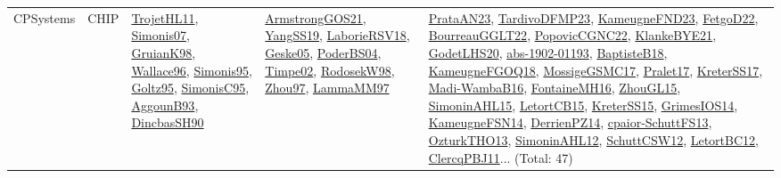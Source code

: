 {\begin{longtable}{lp{3cm}>{\raggedright}p{6cm}>{\raggedright}p{6cm}p{8cm}}
CPSystems & CHIP & \href{articles/TrojetHL11.pdf}{TrojetHL11}\cite{TrojetHL11}, \href{articles/Simonis07.pdf}{Simonis07}\cite{Simonis07}, \href{papers/GruianK98.pdf}{GruianK98}\cite{GruianK98}, \href{articles/Wallace96.pdf}{Wallace96}\cite{Wallace96}, \href{papers/Simonis95.pdf}{Simonis95}\cite{Simonis95}, \href{papers/Goltz95.pdf}{Goltz95}\cite{Goltz95}, \href{papers/SimonisC95.pdf}{SimonisC95}\cite{SimonisC95}, \href{articles/AggounB93.pdf}{AggounB93}\cite{AggounB93}, \href{articles/DincbasSH90.pdf}{DincbasSH90}\cite{DincbasSH90} & \href{papers/ArmstrongGOS21.pdf}{ArmstrongGOS21}\cite{ArmstrongGOS21}, \href{papers/YangSS19.pdf}{YangSS19}\cite{YangSS19}, \href{articles/LaborieRSV18.pdf}{LaborieRSV18}\cite{LaborieRSV18}, \href{papers/Geske05.pdf}{Geske05}\cite{Geske05}, \href{articles/PoderBS04.pdf}{PoderBS04}\cite{PoderBS04}, \href{articles/Timpe02.pdf}{Timpe02}\cite{Timpe02}, \href{papers/RodosekW98.pdf}{RodosekW98}\cite{RodosekW98}, \href{articles/Zhou97.pdf}{Zhou97}\cite{Zhou97}, \href{articles/LammaMM97.pdf}{LammaMM97}\cite{LammaMM97} & \href{articles/PrataAN23.pdf}{PrataAN23}\cite{PrataAN23}, \href{papers/TardivoDFMP23.pdf}{TardivoDFMP23}\cite{TardivoDFMP23}, \href{papers/KameugneFND23.pdf}{KameugneFND23}\cite{KameugneFND23}, \href{articles/FetgoD22.pdf}{FetgoD22}\cite{FetgoD22}, \href{articles/BourreauGGLT22.pdf}{BourreauGGLT22}\cite{BourreauGGLT22}, \href{papers/PopovicCGNC22.pdf}{PopovicCGNC22}\cite{PopovicCGNC22}, \href{papers/KlankeBYE21.pdf}{KlankeBYE21}\cite{KlankeBYE21}, \href{papers/GodetLHS20.pdf}{GodetLHS20}\cite{GodetLHS20}, \href{articles/abs-1902-01193.pdf}{abs-1902-01193}\cite{abs-1902-01193}, \href{articles/BaptisteB18.pdf}{BaptisteB18}\cite{BaptisteB18}, \href{papers/KameugneFGOQ18.pdf}{KameugneFGOQ18}\cite{KameugneFGOQ18}, \href{papers/MossigeGSMC17.pdf}{MossigeGSMC17}\cite{MossigeGSMC17}, \href{papers/Pralet17.pdf}{Pralet17}\cite{Pralet17}, \href{articles/KreterSS17.pdf}{KreterSS17}\cite{KreterSS17}, \href{papers/Madi-WambaB16.pdf}{Madi-WambaB16}\cite{Madi-WambaB16}, \href{papers/FontaineMH16.pdf}{FontaineMH16}\cite{FontaineMH16}, \href{papers/ZhouGL15.pdf}{ZhouGL15}\cite{ZhouGL15}, \href{articles/SimoninAHL15.pdf}{SimoninAHL15}\cite{SimoninAHL15}, \href{articles/LetortCB15.pdf}{LetortCB15}\cite{LetortCB15}, \href{papers/KreterSS15.pdf}{KreterSS15}\cite{KreterSS15}, \href{articles/GrimesIOS14.pdf}{GrimesIOS14}\cite{GrimesIOS14}, \href{articles/KameugneFSN14.pdf}{KameugneFSN14}\cite{KameugneFSN14}, \href{papers/DerrienPZ14.pdf}{DerrienPZ14}\cite{DerrienPZ14}, \href{papers/cpaior-SchuttFS13.pdf}{cpaior-SchuttFS13}\cite{cpaior-SchuttFS13}, \href{articles/OzturkTHO13.pdf}{OzturkTHO13}\cite{OzturkTHO13}, \href{papers/SimoninAHL12.pdf}{SimoninAHL12}\cite{SimoninAHL12}, \href{papers/SchuttCSW12.pdf}{SchuttCSW12}\cite{SchuttCSW12}, \href{papers/LetortBC12.pdf}{LetortBC12}\cite{LetortBC12}, \href{papers/ClercqPBJ11.pdf}{ClercqPBJ11}\cite{ClercqPBJ11}... (Total: 47)\\

\end{longtable}}
